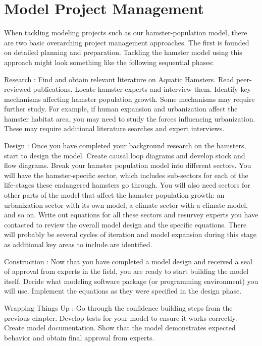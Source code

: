 \documentclass[]{memoir}
\begin{document}
\section{Model Project Management}

When tackling modeling projects such as our hamster-population model,
there are two basic overarching project management approaches. The first
is founded on detailed planning and preparation. Tackling the hamster
model using this approach might look something like the following
sequential phases:

Research : Find and obtain relevant literature on Aquatic Hamsters. Read
peer-reviewed publications. Locate hamster experts and interview them.
Identify key mechanisms affecting hamster population growth. Some
mechanisms may require further study. For example, if human expansion
and urbanization affect the hamster habitat area, you may need to study
the forces influencing urbanization. These may require additional
literature searches and expert interviews.

Design : Once you have completed your background research on the
hamsters, start to design the model. Create causal loop diagrams and
develop stock and flow diagrams. Break your hamster population model
into different sectors. You will have the hamster-specific sector, which
includes sub-sectors for each of the life-stages these endangered
hamsters go through. You will also need sectors for other parts of the
model that affect the hamster population growth: an urbanization sector
with its own model, a climate sector with a climate model, and so on.
Write out equations for all these sectors and resurvey experts you have
contacted to review the overall model design and the specific equations.
There will probably be several cycles of iteration and model expansion
during this stage as additional key areas to include are identified.

Construction : Now that you have completed a model design and received a
seal of approval from experts in the field, you are ready to start
building the model itself. Decide what modeling software package (or
programming environment) you will use. Implement the equations as they
were specified in the design phase.

Wrapping Things Up : Go through the confidence building steps from the
previous chapter. Develop tests for your model to ensure it works
correctly. Create model documentation. Show that the model demonstrates
expected behavior and obtain final approval from experts.
\end{document}
